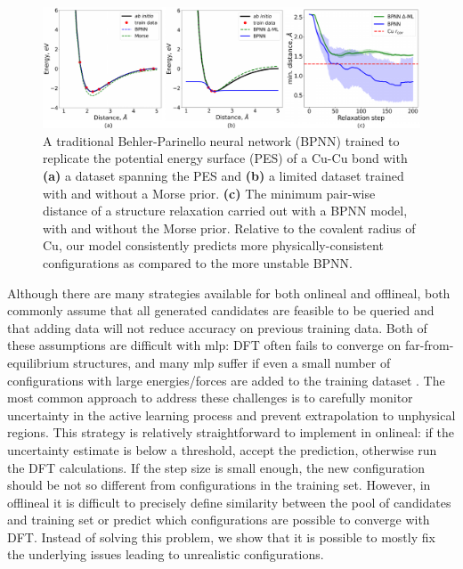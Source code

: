 \documentclass[%
 reprint,
 amsmath,amssymb,
 aps,
]{revtex4-2}
\begin{document}
\begin{figure}[!th]
    \centering
    \includegraphics[width=\textwidth]{figures/figure_1.pdf}
    \caption{A traditional Behler-Parinello neural network (BPNN) trained to replicate the potential energy surface (PES) of a Cu-Cu bond with \textbf{(a)} a dataset spanning the PES and \textbf{(b)} a limited dataset trained with and without a Morse prior. \textbf{(c)} The minimum pair-wise distance of a structure relaxation carried out with a BPNN model, with and without the Morse prior. Relative to the covalent radius of Cu, our model consistently predicts more physically-consistent configurations as compared to the more unstable BPNN.}
    \label{fig:bond}
\end{figure}  

Although there are many strategies available for both \gls{onlineal} and \gls{offlineal}, both commonly assume that all generated candidates are feasible to be queried and that adding data will not reduce accuracy on previous training data. Both of these assumptions are difficult with \gls{mlp}: \gls{DFT} often fails to converge on far-from-equilibrium structures, and many \gls{mlp} suffer if even a small number of configurations with large energies/forces are added to the training dataset \cite{GarridoTorres2019}. The most common approach to address these challenges is to carefully monitor uncertainty in the active learning process and prevent extrapolation to unphysical regions. This strategy is relatively straightforward to implement in \gls{onlineal}: if the uncertainty estimate is below a threshold, accept the prediction, otherwise run the DFT calculations. If the step size is small enough, the new configuration should be not so different from configurations in the training set. However, in \gls{offlineal} it is difficult to precisely define similarity between the pool of candidates and training set or predict which configurations are possible to converge with \gls{DFT}. Instead of solving this problem, we show that it is possible to mostly fix the underlying issues leading to unrealistic configurations. 
\end{document}
